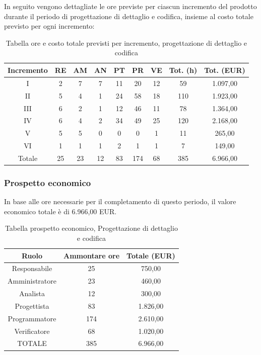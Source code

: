 \FloatBarrier
\noindent In seguito vengono dettagliate le ore previste per ciascun incremento del prodotto durante il periodo di progettazione di dettaglio e codifica, insieme al costo totale previsto per ogni incremento:
\begin{table}[h]
	\caption{Tabella ore e costo totale previsti per incremento, progettazione di dettaglio e codifica}
	\begin{center}
		\begin{tabular}{ |c|c|c|c|c|c|c|c|c|  }
			\hline
			Incremento 		& RE 	& AM 	& AN 	& PT 	& PR 	& VE 	& Tot. (h) & Tot. (EUR) \\
			\hline\hline
			I		& 2 		& 7			& 7 	& 11 	& 20 		& 12 		& 59	 & 1.097,00\\
			II		& 5 		& 4 		& 1 	& 24	& 58 		& 18 		&110	&1.923,00\\
			III		& 6 		& 2 		& 1 	& 12	& 46 		& 11 		& 78	&1.364,00\\
			IV		& 6 		& 4 		& 2 	& 34 	& 49 		& 25 		& 120 	&2.168,00\\
			V		& 5 		& 5 		& 0 	& 0		& 0 		& 1	 		& 11			&265,00\\
			VI		& 1 		& 1 		& 1 	& 2 	& 1 		& 1 		& 7			&149,00\\
			\hline\hline
			Totale		& 25		& 23		& 12 	& 83	 	& 174 	& 68 	& 385 	&6.966,00\\
			\hline
		\end{tabular}
	\end{center}
\end{table}

\subsubsection{Prospetto economico}
In base alle ore necessarie per il completamento di questo periodo, il valore economico totale è di 6.966,00 EUR.
\begin{table}[h]
\caption{Tabella prospetto economico, Progettazione di dettaglio e codifica}
\begin{center}
\begin{tabular}{ |c|c|c|  }
 \hline
 Ruolo 		& Ammontare ore 	& Totale (EUR)\\
 	\hline
 \hline
 	Responsabile	& 25 		& 750,00\\
	Amministratore	& 23		& 460,00\\
	Analista		& 12 	& 300,00\\
	Progettista		& 83		& 1.826,00\\
	Programmatore	& 174		& 2.610,00 \\
	Verificatore	& 68 	& 1.020,00\\
 \hline\hline
 TOTALE		& 385		& 6.966,00\\
  \hline
\end{tabular}
\end{center}
\end{table}
\newpage
